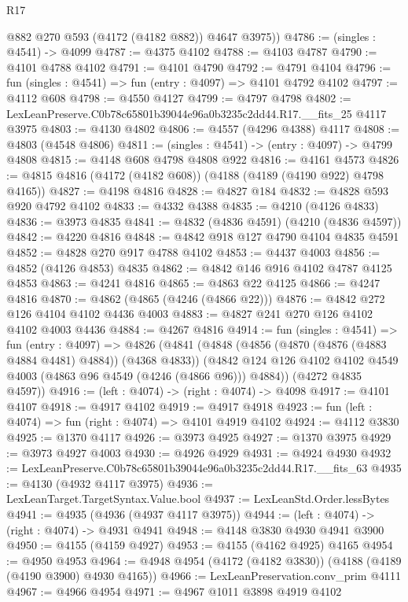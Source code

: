 \begin{lexlean}{R17}
\begin{coremodule}
        @882
        @270
        @593
        (@4172 (@4182 @882))
        @4647
        @3975))
@4786 := (singles : @4541) -> @4099
@4787 := @4375 @4102
@4788 := @4103 @4787
@4790 := @4101 @4788 @4102
@4791 := @4101 @4790
@4792 := @4791 @4104
@4796 := fun (singles : @4541) => fun (entry : @4097) => @4101 @4792 @4102
@4797 := @4112 @608
@4798 := @4550 @4127
@4799 := @4797 @4798
@4802 := LexLeanPreserve.C0b78c65801b39044e96a0b3235c2dd44.R17.__fits_25 @4117 @3975
@4803 := @4130 @4802
@4806 := @4557 (@4296 @4388) @4117
@4808 := @4803 (@4548 @4806)
@4811 := (singles : @4541) -> (entry : @4097) -> @4799 @4808
@4815 := @4148 @608 @4798 @4808 @922
@4816 := @4161 @4573
@4826 := @4815 @4816 (@4172 (@4182 @608)) (@4188 (@4189 (@4190 @922) @4798 @4165))
@4827 := @4198 @4816
@4828 := @4827 @184
@4832 := @4828 @593 @920 @4792 @4102
@4833 := @4332 @4388
@4835 := @4210 (@4126 @4833)
@4836 := @3973 @4835
@4841 := @4832 (@4836 @4591) (@4210 (@4836 @4597))
@4842 := @4220 @4816
@4848 := @4842 @918 @127 @4790 @4104 @4835 @4591
@4852 := @4828 @270 @917 @4788 @4102
@4853 := @4437 @4003
@4856 := @4852 (@4126 @4853) @4835
@4862 := @4842 @146 @916 @4102 @4787 @4125 @4853
@4863 := @4241 @4816
@4865 := @4863 @22 @4125
@4866 := @4247 @4816
@4870 := @4862 (@4865 (@4246 (@4866 @22)))
@4876 := @4842 @272 @126 @4104 @4102 @4436 @4003
@4883 := @4827 @241 @270 @126 @4102 @4102 @4003 @4436
@4884 := @4267 @4816
@4914 := fun (singles : @4541) =>
  fun (entry : @4097) =>
  @4826
    (@4841
      (@4848
        (@4856 (@4870 (@4876 (@4883 @4884 @4481) @4884)) (@4368 @4833))
        (@4842 @124 @126 @4102 @4102 @4549 @4003 (@4863 @96 @4549 (@4246 (@4866 @96))) @4884))
      (@4272 @4835 @4597))
@4916 := (left : @4074) -> (right : @4074) -> @4098
@4917 := @4101 @4107
@4918 := @4917 @4102
@4919 := @4917 @4918
@4923 := fun (left : @4074) => fun (right : @4074) => @4101 @4919 @4102
@4924 := @4112 @3830
@4925 := @1370 @4117
@4926 := @3973 @4925
@4927 := @1370 @3975
@4929 := @3973 @4927 @4003
@4930 := @4926 @4929
@4931 := @4924 @4930
@4932 := LexLeanPreserve.C0b78c65801b39044e96a0b3235c2dd44.R17.__fits_63
@4935 := @4130 (@4932 @4117 @3975)
@4936 := LexLeanTarget.TargetSyntax.Value.bool
@4937 := LexLeanStd.Order.lessBytes
@4941 := @4935 (@4936 (@4937 @4117 @3975))
@4944 := (left : @4074) -> (right : @4074) -> @4931 @4941
@4948 := @4148 @3830 @4930 @4941 @3900
@4950 := @4155 (@4159 @4927)
@4953 := @4155 (@4162 @4925) @4165
@4954 := @4950 @4953
@4964 := @4948 @4954 (@4172 (@4182 @3830)) (@4188 (@4189 (@4190 @3900) @4930 @4165))
@4966 := LexLeanPreservation.conv_prim @4111
@4967 := @4966 @4954
@4971 := @4967 @1011 @3898 @4919 @4102

\end{coremodule}
\end{lexlean}
